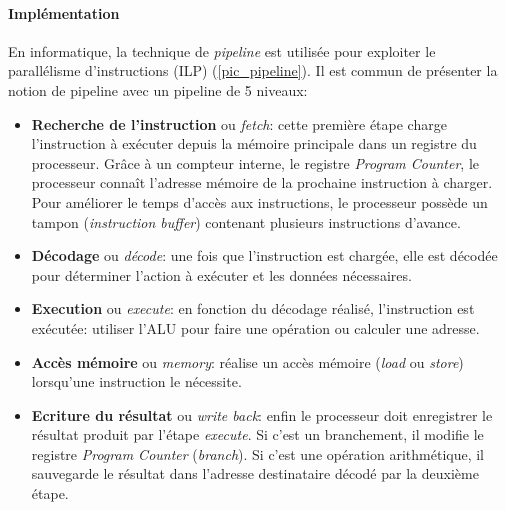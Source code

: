         
        \paragraph{Implémentation}
            
            En informatique, la technique de \textit{pipeline} est utilisée pour exploiter le parallélisme d'instructions (ILP) (\autoref{pic_pipeline}). Il est commun de présenter la notion de pipeline avec un pipeline de 5 niveaux:
            
            \begin{itemize}
                \item \textbf{Recherche de l'instruction} ou \textit{fetch}: cette première étape charge l'instruction à exécuter depuis la mémoire principale dans un registre du processeur. Grâce à un compteur interne, le registre \textit{Program Counter}, le processeur connaît l'adresse mémoire de la prochaine instruction à charger. Pour améliorer le temps d'accès aux instructions, le processeur possède un tampon (\textit{instruction buffer}) contenant plusieurs instructions d'avance.
                \item \textbf{Décodage} ou \textit{décode}: une fois que l'instruction est chargée, elle est décodée pour déterminer l'action à exécuter et les données nécessaires.
                \item \textbf{Execution} ou \textit{execute}: en fonction du décodage réalisé, l'instruction est exécutée: utiliser l'ALU pour faire une opération ou calculer une adresse.
                \item \textbf{Accès mémoire} ou \textit{memory}: réalise un accès mémoire (\textit{load} ou \textit{store}) lorsqu'une instruction le nécessite.
                \item \textbf{Ecriture du résultat} ou \textit{write back}: enfin le processeur doit enregistrer le résultat produit par l'étape \textit{execute}. Si c'est un branchement, il modifie le registre \textit{Program Counter} (\textit{branch}). Si c'est une opération arithmétique, il sauvegarde le résultat dans l'adresse destinataire décodé par la deuxième étape.
            \end{itemize}
            
